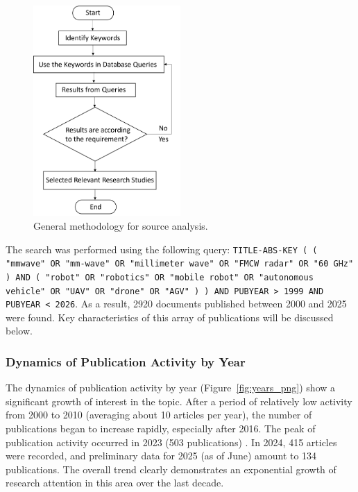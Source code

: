 \begin{figure}[H]
\centering
\includegraphics[width=0.5\textwidth]{Src/images/width_559.png}
\caption{General methodology for source analysis.}
\label{fig:methodology_flowchart}
\end{figure}

The search was performed using the following query: \texttt{TITLE-ABS-KEY ( ( "mmwave" OR "mm-wave" OR "millimeter wave" OR "FMCW radar" OR "60 GHz" ) AND ( "robot" OR "robotics" OR "mobile robot" OR "autonomous vehicle" OR "UAV" OR "drone" OR "AGV" ) ) AND PUBYEAR > 1999 AND PUBYEAR < 2026}. As a result, 2920 documents published between 2000 and 2025 were found. Key characteristics of this array of publications will be discussed below.

\subsubsection*{Dynamics of Publication Activity by Year}
The dynamics of publication activity by year (Figure~\ref{fig:years_png}) show a significant growth of interest in the topic. After a period of relatively low activity from 2000 to 2010 (averaging about 10 articles per year), the number of publications began to increase rapidly, especially after 2016. The peak of publication activity occurred in 2023 (503 publications) \citep{Kim2020MulRan}. In 2024, 415 articles were recorded, and preliminary data for 2025 (as of June) amount to 134 publications. The overall trend clearly demonstrates an exponential growth of research attention in this area over the last decade.

